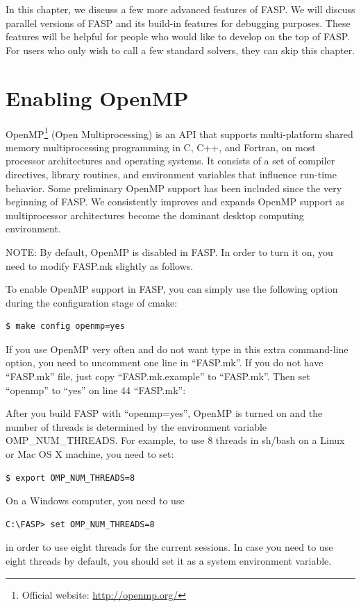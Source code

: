 \documentclass[11pt]{memoir}
\begin{document}
In this chapter, we discuss a few more advanced features of FASP. We
will discuss parallel versions of FASP and its build-in features for
debugging purposes. These features will be helpful for people who
would like to develop on the top of FASP. For users who only wish to
call a few standard solvers, they can skip this chapter.

\section{Enabling OpenMP}\label{sec:mop}

OpenMP\footnote{Official website: \url{http://openmp.org/}} (Open Multiprocessing) is an API that supports multi-platform shared memory multiprocessing programming in C, C++, and Fortran, on most processor architectures and operating systems. It consists of a set of compiler directives, library routines, and environment variables that influence run-time behavior. Some preliminary OpenMP support has been included since the very beginning of FASP. We consistently improves and expands OpenMP support as multiprocessor architectures become the dominant desktop computing environment.

\begin{snugshade}\noindent
NOTE: By default, OpenMP is disabled in FASP. In order to turn it on, you need to modify FASP.mk slightly as follows.
\end{snugshade}

To enable OpenMP support in FASP, you can simply use the following option during the configuration stage of cmake:
%
\begin{lstlisting}[numbers=none]
$ make config openmp=yes
\end{lstlisting}
%
If you use OpenMP very often and do not want type in this extra
command-line option, you need to uncomment one line in ``FASP.mk''.
If you do not have ``FASP.mk'' file, just copy ``FASP.mk.example'' to
``FASP.mk''. Then set ``openmp'' to ``yes'' on line 44 ``FASP.mk'':


After you build FASP with ``openmp=yes'', OpenMP is turned on and the number of threads is determined by the environment variable OMP\_NUM\_THREADS. For example, to use 8 threads in {\color{red} sh/bash} on a Linux or Mac OS X machine, you need to set:
\begin{lstlisting}[numbers=none]
$ export OMP_NUM_THREADS=8
\end{lstlisting}
On a Windows computer, you need to use 
\begin{lstlisting}[numbers=none]
C:\FASP> set OMP_NUM_THREADS=8
\end{lstlisting}
in order to use eight threads for the current sessions. In case you need to use eight threads by default, you should set it as a system environment variable. 
\end{document}
